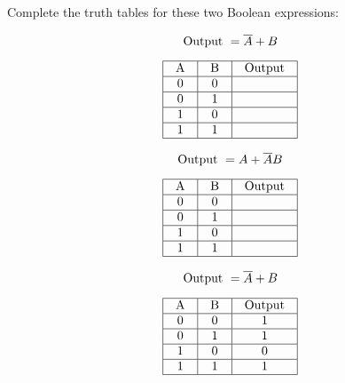 

Complete the truth tables for these two Boolean expressions:


$$\hbox{Output } = \overline{A} + B$$

$$\vbox{\offinterlineskip
\halign{\strut
\vrule \quad\hfil # \ \hfil & 
\vrule \quad\hfil # \ \hfil & 
\vrule \quad\hfil # \ \hfil \vrule \cr
\noalign{\hrule}
%
A & B & Output \cr
%
\noalign{\hrule}
%
0 & 0 &  \cr
%
\noalign{\hrule}
%
0 & 1 &  \cr
%
\noalign{\hrule}
%
1 & 0 &  \cr
%
\noalign{\hrule}
%
1 & 1 &  \cr
%
\noalign{\hrule}
} %
}$$ %


\vskip 20pt


$$\hbox{Output } = A + \overline{A}B$$

$$\vbox{\offinterlineskip
\halign{\strut
\vrule \quad\hfil # \ \hfil & 
\vrule \quad\hfil # \ \hfil & 
\vrule \quad\hfil # \ \hfil \vrule \cr
\noalign{\hrule}
%
A & B & Output \cr
%
\noalign{\hrule}
%
0 & 0 &  \cr
%
\noalign{\hrule}
%
0 & 1 &  \cr
%
\noalign{\hrule}
%
1 & 0 &  \cr
%
\noalign{\hrule}
%
1 & 1 &  \cr
%
\noalign{\hrule}
} %
}$$ %








$$\hbox{Output } = \overline{A} + B$$

$$\vbox{\offinterlineskip
\halign{\strut
\vrule \quad\hfil # \ \hfil & 
\vrule \quad\hfil # \ \hfil & 
\vrule \quad\hfil # \ \hfil \vrule \cr
\noalign{\hrule}
%
A & B & Output \cr
%
\noalign{\hrule}
%
0 & 0 & 1 \cr
%
\noalign{\hrule}
%
0 & 1 & 1 \cr
%
\noalign{\hrule}
%
1 & 0 & 0 \cr
%
\noalign{\hrule}
%
1 & 1 & 1 \cr
%
\noalign{\hrule}
} %
}$$ %


